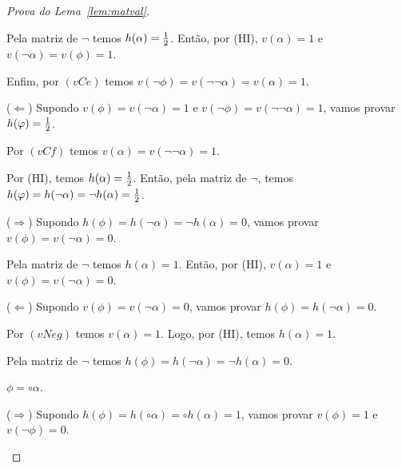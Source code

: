 \begin{proof}[Prova do Lema~\ref{lem:matval}]
\begin{provaporcasos}
\begin{provaporsubcasos}
                        Pela matriz de $\neg$ temos $h(\alpha) = \frac{1}{2}{}$. Então, por (HI), $v(\alpha) = 1$ e $v(\neg \alpha) = v(\phi) = 1$.
                        
                        Enfim, por $(vCe)$ temos $v(\neg \phi) = v(\neg \neg \alpha) = v(\alpha) = 1$.
                        
                        ($\Longleftarrow$) Supondo $v(\phi) = v(\neg \alpha) = 1$ e $v(\neg \phi) = v(\neg \neg \alpha)= 1$, vamos provar $h(\varphi) = \frac{1}{2}{}$.

                        Por $(vCf)$ temos $v(\alpha) = v(\neg \neg \alpha) = 1$.
                        
                        Por (HI), temos $h(\alpha) = \frac{1}{2}{}$. Então, pela matriz de $\neg$, temos $h(\varphi) = h(\neg \alpha) = \neg h(\alpha) = \frac{1}{2}{}$.
                    
                        
                        ($\Longrightarrow$) Supondo $h(\phi) = h(\neg \alpha) = \neg h(\alpha) = 0$, vamos provar $v(\phi) = v(\neg \alpha) = 0$.
                        
                        Pela matriz de $\neg$ temos $h(\alpha) = 1$. Então, por (HI), $v(\alpha) = 1$ e $v(\phi) = v(\neg \alpha) = 0$.
                    
                        ($\Longleftarrow$) Supondo $v(\phi) = v(\neg \alpha) = 0$, vamos provar $h(\phi) = h(\neg \alpha) = 0$.
                    
                        Por $(vNeg)$ temos $v(\alpha) = 1$. Logo, por (HI), temos $h(\alpha) = 1$.
                        
                        Pela matriz de $\neg$ temos $h(\phi) = h(\neg \alpha) = \neg h(\alpha) = 0$.
                \end{provaporsubcasos}
                    
            \casodeprova{} $\phi = \circ \alpha$.
                    
                \begin{provaporsubcasos}
                    

                        ($\Longrightarrow$) Supondo $h(\phi) = h(\circ \alpha) = \circ h(\alpha) = 1$, vamos provar $v(\phi) = 1$ e $v(\neg \phi) = 0$.
                        

\end{provaporsubcasos}
\end{provaporcasos}
\end{proof}
